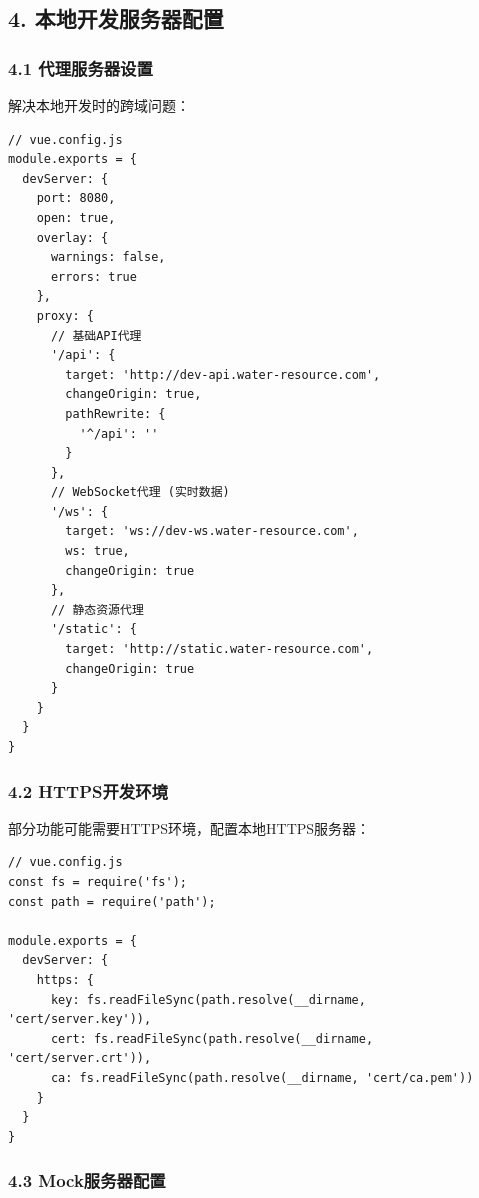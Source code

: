 \subsection{4.
本地开发服务器配置}\label{ux672cux5730ux5f00ux53d1ux670dux52a1ux5668ux914dux7f6e}

\subsubsection{4.1
代理服务器设置}\label{ux4ee3ux7406ux670dux52a1ux5668ux8bbeux7f6e}

解决本地开发时的跨域问题：

\begin{lstlisting}
// vue.config.js
module.exports = {
  devServer: {
    port: 8080,
    open: true,
    overlay: {
      warnings: false,
      errors: true
    },
    proxy: {
      // 基础API代理
      '/api': {
        target: 'http://dev-api.water-resource.com',
        changeOrigin: true,
        pathRewrite: {
          '^/api': ''
        }
      },
      // WebSocket代理 (实时数据)
      '/ws': {
        target: 'ws://dev-ws.water-resource.com',
        ws: true,
        changeOrigin: true
      },
      // 静态资源代理
      '/static': {
        target: 'http://static.water-resource.com',
        changeOrigin: true
      }
    }
  }
}
\end{lstlisting}

\subsubsection{4.2 HTTPS开发环境}\label{httpsux5f00ux53d1ux73afux5883}

部分功能可能需要HTTPS环境，配置本地HTTPS服务器：

\begin{lstlisting}
// vue.config.js
const fs = require('fs');
const path = require('path');

module.exports = {
  devServer: {
    https: {
      key: fs.readFileSync(path.resolve(__dirname, 'cert/server.key')),
      cert: fs.readFileSync(path.resolve(__dirname, 'cert/server.crt')),
      ca: fs.readFileSync(path.resolve(__dirname, 'cert/ca.pem'))
    }
  }
}
\end{lstlisting}

\subsubsection{4.3
Mock服务器配置}\label{mockux670dux52a1ux5668ux914dux7f6e}

